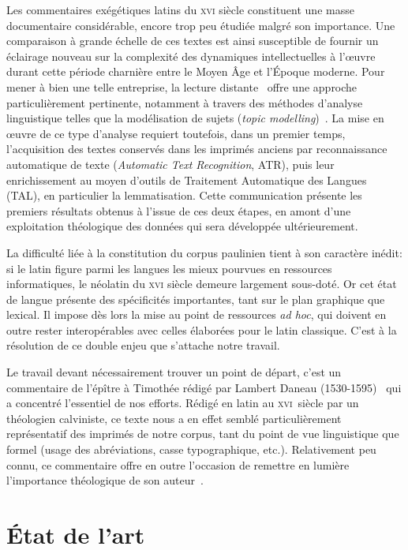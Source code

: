 \documentclass[final, fra]{anthology-ch}      %
\begin{document}
Les commentaires exégétiques latins du \textsc{xvi}\ieme{} siècle constituent une masse documentaire considérable, encore trop peu étudiée malgré son importance. Une comparaison à grande échelle de ces textes est ainsi susceptible de fournir un éclairage nouveau sur la complexité des dynamiques intellectuelles à l’œuvre durant cette période charnière entre le Moyen Âge et l’Époque moderne. Pour mener à bien une telle entreprise, la lecture distante~\cite{moretti_distant_2013} offre une approche particulièrement pertinente, notamment à travers des méthodes d’analyse linguistique telles que la modélisation de sujets (\textit{topic modelling})~\cite{schoch_2017_topicmodeling}. La mise en œuvre de ce type d’analyse requiert toutefois, dans un premier temps, l’acquisition des textes conservés dans les imprimés anciens par reconnaissance automatique de texte (\textit{Automatic Text Recognition}, ATR), puis leur enrichissement au moyen d’outils de Traitement Automatique des Langues (TAL), en particulier la lemmatisation. Cette communication présente les premiers résultats obtenus à l’issue de ces deux étapes, en amont d’une exploitation théologique des données qui sera développée ultérieurement.

La difficulté liée à la constitution du corpus paulinien tient à son caractère inédit: si le latin figure parmi les langues les mieux pourvues en ressources informatiques, le néolatin du \textsc{xvi}\ieme{} siècle demeure largement sous-doté. Or cet état de langue présente des spécificités importantes, tant sur le plan graphique que lexical. Il impose dès lors la mise au point de ressources \textit{ad hoc}, qui doivent en outre rester interopérables avec celles élaborées pour le latin classique. C’est à la résolution de ce double enjeu que s’attache notre travail.

Le travail devant nécessairement trouver un point de départ, c’est un commentaire de l’épître à Timothée rédigé par Lambert Daneau (1530-1595)~\cite{daneau1577} qui a concentré l’essentiel de nos efforts. Rédigé en latin au \textsc{xvi}\ieme{}~siècle par un théologien calviniste, ce texte nous a en effet semblé particulièrement représentatif des imprimés de notre corpus, tant du point de vue linguistique que formel (usage des abréviations, casse typographique, etc.). Relativement peu connu, ce commentaire offre en outre l’occasion de remettre en lumière l’importance théologique de son auteur~\cite{ZahndDaneauKommnetiert}.

\section{État de l'art}
\end{document}
